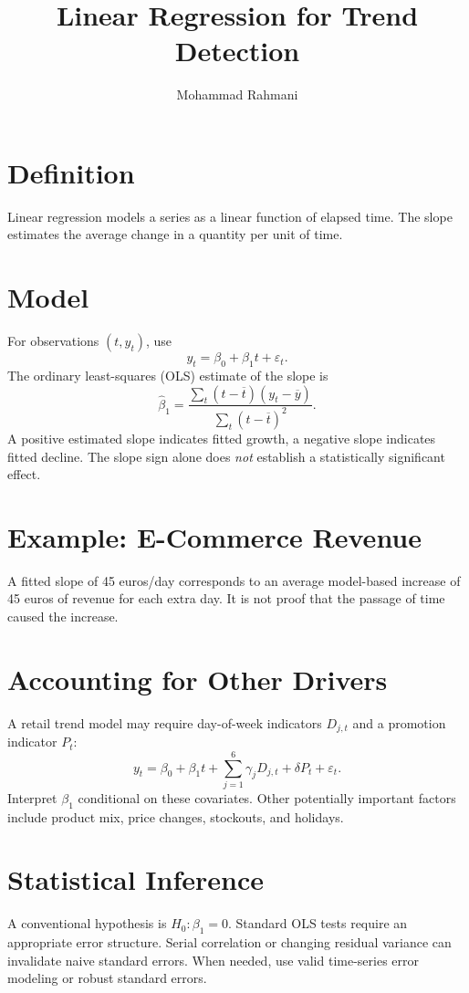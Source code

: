 \documentclass[a4paper]{article}
\title{Linear Regression for Trend Detection}
\date{}
\author{Mohammad Rahmani}
\begin{document}
\maketitle

\section{Definition}
Linear regression models a series as a linear function of elapsed time. The slope estimates the average change in a quantity per unit of time.

\section{Model}
For observations $(t,y_t)$, use
\[
 y_t=\beta_0+\beta_1 t+\varepsilon_t.
\]
The ordinary least-squares (OLS) estimate of the slope is
\[
 \widehat\beta_1 =
 \frac{\sum_t(t-\overline t)(y_t-\overline y)}
      {\sum_t(t-\overline t)^2}.
\]
A positive estimated slope indicates fitted growth, a negative slope indicates fitted decline. The slope sign alone does \emph{not} establish a statistically significant effect.

\section{Example: E-Commerce Revenue}
A fitted slope of 45 euros/day corresponds to an average model-based increase of 45 euros of revenue for each extra day. It is not proof that the passage of time caused the increase.

\section{Accounting for Other Drivers}
A retail trend model may require day-of-week indicators $D_{j,t}$ and a promotion indicator $P_t$:
\[
 y_t=\beta_0+\beta_1t+\sum_{j=1}^{6}\gamma_jD_{j,t}
       +\delta P_t+\varepsilon_t.
\]
Interpret $\beta_1$ conditional on these covariates. Other potentially important factors include product mix, price changes, stockouts, and holidays.

\section{Statistical Inference}
A conventional hypothesis is $H_0:\beta_1=0$. Standard OLS tests require an appropriate error structure. Serial correlation or changing residual variance can invalidate naive standard errors. When needed, use valid time-series error modeling or robust standard errors.
\end{document}
